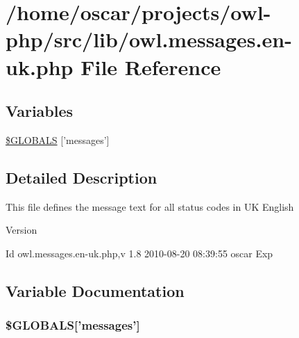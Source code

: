 \section{/home/oscar/projects/owl-\/php/src/lib/owl.messages.en-\/uk.php File Reference}
\label{owl_8messages_8en-uk_8php}
\subsection*{Variables}
\begin{DoxyCompactItemize}
\item 
\hyperlink{owl_8messages_8en-uk_8php_a65f2996116eed36e9ab25f254a470259}{\$GLOBALS} \mbox{[}'messages'\mbox{]}
\end{DoxyCompactItemize}


\subsection{Detailed Description}
This file defines the message text for all status codes in UK English \begin{DoxyVersion}{Version}

\end{DoxyVersion}
\begin{DoxyParagraph}{Id}
owl.messages.en-\/uk.php,v 1.8 2010-\/08-\/20 08:39:55 oscar Exp 
\end{DoxyParagraph}


\subsection{Variable Documentation}
\subsubsection[{\$GLOBALS}]{\setlength{\rightskip}{0pt plus 5cm}\$GLOBALS\mbox{[}'messages'\mbox{]}}\label{owl_8messages_8en-uk_8php_a65f2996116eed36e9ab25f254a470259}
